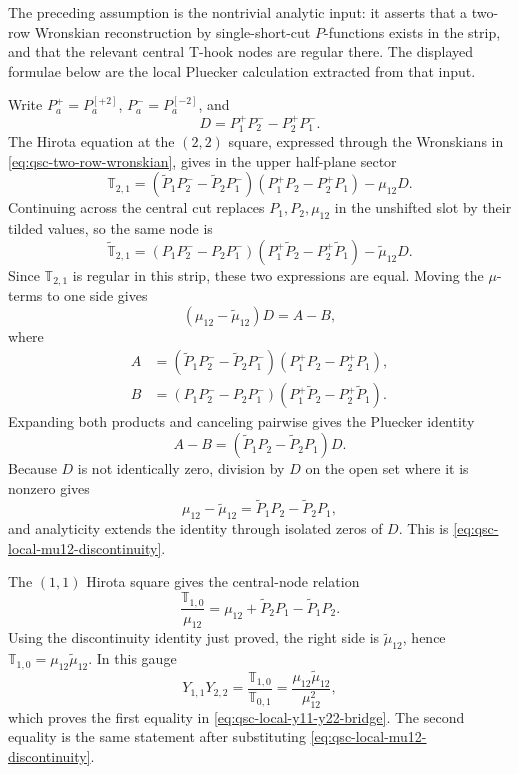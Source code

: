 The preceding assumption is the nontrivial analytic input: it asserts that a
two-row Wronskian reconstruction by single-short-cut \(P\)-functions exists
in the strip, and that the relevant central T-hook nodes are regular there.
The displayed formulae below are the local Pluecker calculation extracted
from that input.

Write \(P_a^+=P_a^{[+2]}\), \(P_a^-=P_a^{[-2]}\), and
\[
  D=P_1^+P_2^- - P_2^+P_1^- .
\]
The Hirota equation at the \((2,2)\) square, expressed through the
Wronskians in \eqref{eq:qsc-two-row-wronskian}, gives in the upper
half-plane sector
\[
  \mathbb T_{2,1}
  =
  (\widetilde P_1P_2^- - \widetilde P_2P_1^-)
  (P_1^+P_2-P_2^+P_1)
  -\mu_{12}D .
\]
Continuing across the central cut replaces \(P_1,P_2,\mu_{12}\) in the
unshifted slot by their tilded values, so the same node is
\[
  \widetilde{\mathbb T}_{2,1}
  =
  (P_1P_2^- - P_2P_1^-)
  (P_1^+\widetilde P_2-P_2^+\widetilde P_1)
  -\widetilde\mu_{12}D .
\]
Since \(\mathbb T_{2,1}\) is regular in this strip, these two expressions
are equal.  Moving the \(\mu\)-terms to one side gives
\[
  (\mu_{12}-\widetilde\mu_{12})D
  =
  A-B,
\]
where
\[
\begin{aligned}
  A&=(\widetilde P_1P_2^- - \widetilde P_2P_1^-)
    (P_1^+P_2-P_2^+P_1),\\
  B&=(P_1P_2^- - P_2P_1^-)
    (P_1^+\widetilde P_2-P_2^+\widetilde P_1).
\end{aligned}
\]
Expanding both products and canceling pairwise gives the Pluecker identity
\[
  A-B=(\widetilde P_1P_2-\widetilde P_2P_1)D.
\]
Because \(D\) is not identically zero, division by \(D\) on the open set
where it is nonzero gives
\[
  \mu_{12}-\widetilde\mu_{12}
  =
  \widetilde P_1P_2-\widetilde P_2P_1,
\]
and analyticity extends the identity through isolated zeros of \(D\).  This
is \eqref{eq:qsc-local-mu12-discontinuity}.

The \((1,1)\) Hirota square gives the central-node relation
\[
  \frac{\mathbb T_{1,0}}{\mu_{12}}
  =
  \mu_{12}+\widetilde P_2P_1-\widetilde P_1P_2 .
\]
Using the discontinuity identity just proved, the right side is
\(\widetilde\mu_{12}\), hence
\(\mathbb T_{1,0}=\mu_{12}\widetilde\mu_{12}\).  In this gauge
\[
  Y_{1,1}Y_{2,2}
  =
  \frac{\mathbb T_{1,0}}{\mathbb T_{0,1}}
  =
  \frac{\mu_{12}\widetilde\mu_{12}}{\mu_{12}^2},
\]
which proves the first equality in
\eqref{eq:qsc-local-y11-y22-bridge}.  The second equality is the same
statement after substituting
\eqref{eq:qsc-local-mu12-discontinuity}.

